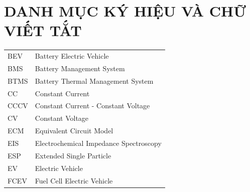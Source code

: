 \documentclass{thesis}
\begin{document}
    \tableofcontents
    \thispagestyle{empty}
    \newpage
    \thispagestyle{empty}
    \cleardoublepage
    
\section*{DANH MỤC KÝ HIỆU VÀ CHỮ VIẾT TẮT}
 {}

\begin{tabular}{ l l }
    \hspace{1cm} BEV & \hspace{4cm} Battery Electric Vehicle \\
    \hspace{1cm} BMS & \hspace{4cm} Battery Management System \\
    \hspace{1cm} BTMS & \hspace{4cm} Battery Thermal Management System \\
    \hspace{1cm} CC & \hspace{4cm} Constant Current \\
    \hspace{1cm} CCCV & \hspace{4cm} Constant Current - Constant Voltage \\
    \hspace{1cm} CV & \hspace{4cm} Constant Voltage \\
    \hspace{1cm} ECM & \hspace{4cm} Equivalent Circuit Model \\
    \hspace{1cm} EIS & \hspace{4cm} Electrochemical Impedance Spectroscopy \\
    \hspace{1cm} ESP & \hspace{4cm} Extended Single Particle \\
    \hspace{1cm} EV & \hspace{4cm} Electric Vehicle \\
    \hspace{1cm} FCEV & \hspace{4cm} Fuel Cell Electric Vehicle \\

\end{tabular}
\end{document}
